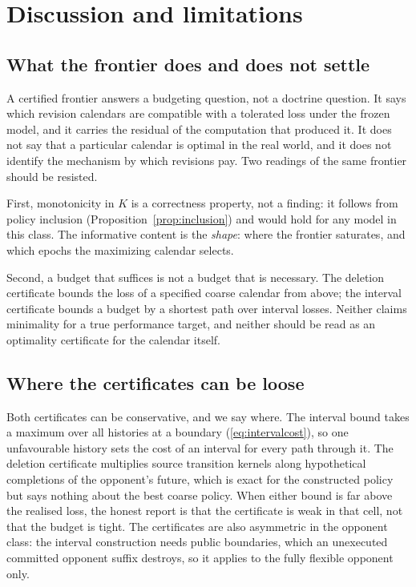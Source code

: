 \section{Discussion and limitations}\label{sec:discussion}

\subsection{What the frontier does and does not settle}

A certified frontier answers a budgeting question, not a doctrine question. It
says which revision calendars are compatible with a tolerated loss under the
frozen model, and it carries the residual of the computation that produced it.
It does not say that a particular calendar is optimal in the real world, and
it does not identify the mechanism by which revisions pay. Two readings of the
same frontier should be resisted.

First, monotonicity in $K$ is a correctness property, not a finding: it follows
from policy inclusion (Proposition~\ref{prop:inclusion}) and would hold for any
model in this class. The informative content is the \emph{shape}: where the
frontier saturates, and which epochs the maximizing calendar selects.

Second, a budget that suffices is not a budget that is necessary. The
deletion certificate bounds the loss of a specified coarse calendar from
above; the interval certificate bounds a budget by a shortest path over
interval losses. Neither claims minimality for a true performance target, and
neither should be read as an optimality certificate for the calendar itself.

\subsection{Where the certificates can be loose}

Both certificates can be conservative, and we say where. The interval bound
takes a maximum over all histories at a boundary
(\eqref{eq:intervalcost}), so one unfavourable history sets the cost of an
interval for every path through it. The deletion certificate multiplies source
transition kernels along hypothetical completions of the opponent's future,
which is exact for the constructed policy but says nothing about the best
coarse policy. When either bound is far above the realised loss, the honest
report is that the certificate is weak in that cell, not that the budget is
tight. The certificates are also asymmetric in the opponent class: the
interval construction needs public boundaries, which an unexecuted committed
opponent suffix destroys, so it applies to the fully flexible opponent only.


